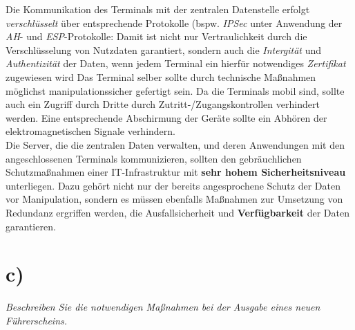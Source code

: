 \noindent
 Die Kommunikation des Terminals mit der zentralen Datenstelle erfolgt \textit{verschlüsselt} über entsprechende Protokolle (bspw. \textit{IPSec} unter Anwendung der \textit{AH}- und \textit{ESP}-Protokolle: Damit ist nicht nur Vertraulichkeit durch die Verschlüsselung von Nutzdaten garantiert, sondern auch die \textit{Intergität} und \textit{Authentizität} der Daten, wenn jedem Terminal ein hierfür notwendiges \textit{Zertifikat} zugewiesen wird
Das Terminal selber sollte durch technische Maßnahmen möglichst manipulationssicher gefertigt sein.
Da die Terminals mobil sind, sollte auch ein Zugriff durch Dritte durch Zutritt-/Zugangskontrollen verhindert werden.
Eine entsprechende Abschirmung der Geräte sollte ein Abhören der elektromagnetischen Signale verhindern.\\

\noindent
Die Server, die die zentralen Daten verwalten, und deren Anwendungen mit den angeschlossenen Terminals kommunizieren, sollten den gebräuchlichen Schutzmaßnahmen einer IT-Infrastruktur mit \textbf{sehr hohem Sicherheitsniveau} unterliegen.
Dazu gehört nicht nur der bereits angesprochene Schutz der Daten vor Manipulation, sondern es müssen ebenfalls Maßnahmen zur Umsetzung von Redundanz ergriffen werden, die Ausfallsicherheit und \textbf{Verfügbarkeit} der Daten garantieren.

\section{c)}

\textit{Beschreiben Sie die notwendigen Maßnahmen bei der Ausgabe eines neuen Führerscheins.}

